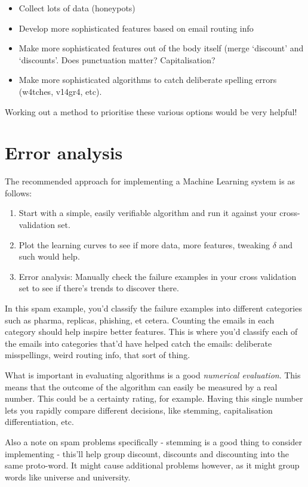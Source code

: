 \begin{itemize}
\item Collect lots of data (honeypots)
\item Develop more sophisticated features based on email routing info
\item Make more sophisticated features out of the body itself (merge `discount' and `discounts'. Does punctuation matter? Capitalisation?
\item Make more sophisticated algorithms to catch deliberate spelling errors (w4tches, v14gr4, etc).
\end{itemize}

Working out a method to prioritise these various options would be very helpful!

\section{Error analysis}

The recommended approach for implementing a Machine Learning system is as follows:

\begin{enumerate}
\item Start with a simple, easily verifiable algorithm and run it against your cross-validation set.
\item Plot the learning curves to see if more data, more features, tweaking $\delta$ and such would help.
\item Error analysis: Manually check the failure examples in your cross validation set to see if there's trends to discover there.
\end{enumerate}

In this spam example, you'd classify the failure examples into different categories such as pharma, replicas, phishing, et cetera. Counting the emails in each category should help inspire better features. This is where you'd classify each of the emails into categories that'd have helped catch the emails: deliberate misspellings, weird routing info, that sort of thing.

What is important in evaluating algorithms is a good \emph{numerical evaluation}. This means that the outcome of the algorithm can easily be measured by a real number. This could be a certainty rating, for example. Having this single number lets you rapidly compare different decisions, like stemming, capitalisation differentiation, etc.

Also a note on spam problems specifically - stemming is a good thing to consider implementing - this'll help group discount, discounts and discounting into the same proto-word. It might cause additional problems however, as it might group words like universe and university.

